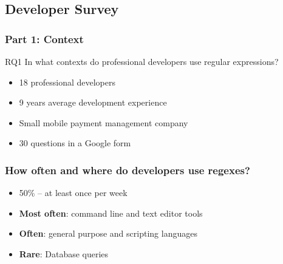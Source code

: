 \subsection{Developer Survey}

\begin{frame}
\frametitle{Part 1: Context}

\begin{block}{RQ1}
In what contexts do professional developers use regular expressions?
\end{block}
%
\begin{itemize}
	\item 18 professional developers 
	\item 9 years average development experience
	\item Small mobile payment management company
	\item 30 questions in a Google form
\end{itemize}
\end{frame}

\begin{frame}
\frametitle{How often and where do developers use regexes?}

\begin{itemize}
	\item 50\%  -- at least once per week
\vspace{12pt}
	\item<2-> {\bf Most often}: command line and text editor tools
	\item<2-> {\bf Often}: general purpose and scripting  languages
	\item<2-> {\bf Rare}: Database queries
\end{itemize}
\end{frame}


